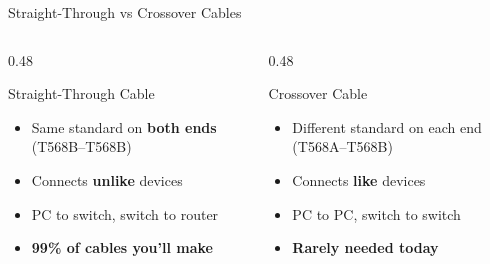 \documentclass[aspectratio=169]{beamer}  %
\begin{document}
\begin{frame}{Straight-Through vs Crossover Cables}
    \begin{columns}[T]
        \begin{column}{0.48\textwidth}
            \begin{block}{Straight-Through Cable}
                \begin{itemize}
                    \item Same standard on \textbf{both ends} (T568B--T568B)
                    \item Connects \textbf{unlike} devices
                    \item PC to switch, switch to router
                    \item \textbf{99\% of cables you'll make}
                \end{itemize}
                
                \centering
            \end{block}
        \end{column}
        \begin{column}{0.48\textwidth}
            \begin{block}{Crossover Cable}
                \begin{itemize}
                    \item Different standard on each end (T568A--T568B)
                    \item Connects \textbf{like} devices
                    \item PC to PC, switch to switch
                    \item \textbf{Rarely needed today}
                \end{itemize}
                
                \centering
            \end{block}
        \end{column}
    \end{columns}
    

\end{frame}
\end{document}
